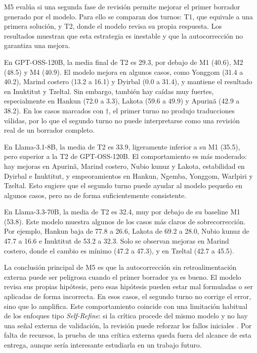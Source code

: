M5 evalúa si una segunda fase de revisión permite mejorar el primer borrador generado por el modelo. Para ello se comparan dos turnos: T1, que equivale a una primera solución, y T2, donde el modelo revisa su propia respuesta. Los resultados muestran que esta estrategia es inestable y que la autocorrección no garantiza una mejora.

En GPT-OSS-120B, la media final de T2 es 29.3, por debajo de M1 (40.6), M2 (48.5) y M4 (40.9). El modelo mejora en algunos casos, como Yonggom (31.4 a 40.2), Marind costero (13.2 a 16.1) y Dyirbal (0.0 a 31.4), y mantiene el resultado en Inuktitut y Tzeltal. Sin embargo, también hay caídas muy fuertes, especialmente en Hankun (72.0 a 3.3), Lakota (59.6 a 49.9) y Apurinã (42.9 a 38.2). En los casos marcados con $\dagger$, el primer turno no produjo traducciones válidas, por lo que el segundo turno no puede interpretarse como una revisión real de un borrador completo.

En Llama-3.1-8B, la media de T2 es 33.9, ligeramente inferior a su M1 (35.5), pero superior a la T2 de GPT-OSS-120B. El comportamiento es más moderado: hay mejoras en Apurinã, Marind costero, Nubio kunuz y Lakota, estabilidad en Dyirbal e Inuktitut, y empeoramientos en Hankun, Ngemba, Yonggom, Warlpiri y Tzeltal. Esto sugiere que el segundo turno puede ayudar al modelo pequeño en algunos casos, pero no de forma suficientemente consistente.

En Llama-3.3-70B, la media de T2 es 32.4, muy por debajo de su baseline M1 (53.8). Este modelo muestra algunos de los casos más claros de sobrecorrección. Por ejemplo, Hankun baja de 77.8 a 26.6, Lakota de 69.2 a 28.0, Nubio kunuz de 47.7 a 16.6 e Inuktitut de 53.2 a 32.3. Solo se observan mejoras en Marind costero, donde el cambio es mínimo (47.2 a 47.3), y en Tzeltal (42.7 a 45.5).

La conclusión principal de M5 es que la autocorrección sin retroalimentación externa puede ser peligrosa cuando el primer borrador ya es bueno. El modelo revisa sus propias hipótesis, pero esas hipótesis pueden estar mal formuladas o ser aplicadas de forma incorrecta. En esos casos, el segundo turno no corrige el error, sino que lo amplifica. Este comportamiento coincide con una limitación habitual de los enfoques tipo \textit{Self-Refine}: si la crítica procede del mismo modelo y no hay una señal externa de validación, la revisión puede reforzar los fallos iniciales \citep{madaan2023selfrefine}. Por falta de recursos, la prueba de una crítica externa queda fuera del alcance de esta entrega, aunque sería interesante estudiarla en un trabajo futuro.

